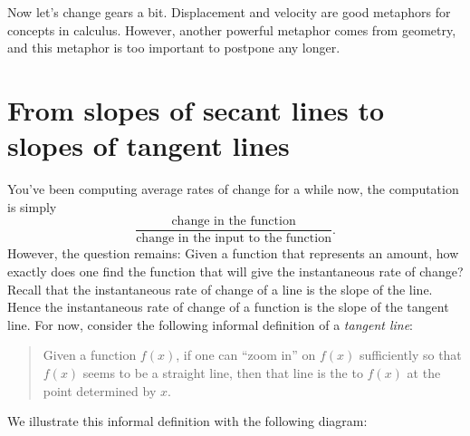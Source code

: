 \documentclass{ximera}
\begin{document}
Now let's change gears a bit. Displacement and velocity are good
metaphors for concepts in calculus. However, another powerful
metaphor comes from geometry, and this metaphor is too important to
postpone any longer.


\section{From slopes of secant lines to slopes of tangent lines}

You've been computing average rates of change for a while now, the
computation is simply
\[
\frac{\text{change in the function}}{\text{change in the input to the
    function}}.
\]
However, the question remains: Given a function that represents an
amount, how exactly does one find the function that will give the
instantaneous rate of change? Recall that the instantaneous rate of change
of a line is the slope of the line.  Hence the instantaneous rate of
change of a function is the slope of the tangent line. For now,
consider the following informal definition of a \textit{tangent line}:
\begin{quote}
Given a function $f(x)$, if one can ``zoom in''
on $f(x)$ sufficiently so that $f(x)$ seems to be a straight line,
then that line is the  to $f(x)$ at the point
determined by $x$.
\end{quote}
We illustrate this informal definition with the following diagram:
\end{document}
